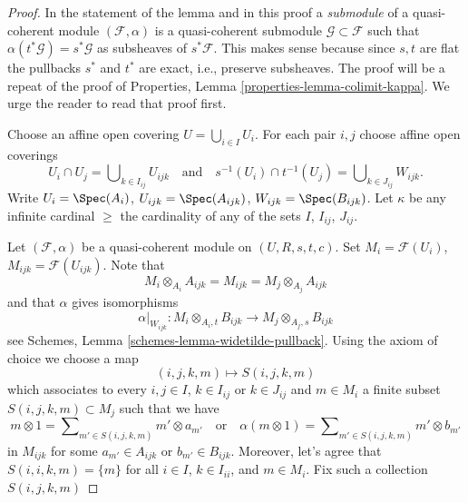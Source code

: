 \begin{proof}
In the statement of the lemma and in this proof
a {\it submodule} of a quasi-coherent module $(\mathcal{F}, \alpha)$
is a quasi-coherent submodule $\mathcal{G} \subset \mathcal{F}$
such that $\alpha(t^*\mathcal{G}) = s^*\mathcal{G}$ as subsheaves of
$s^*\mathcal{F}$. This makes sense because since $s, t$ are flat the
pullbacks $s^*$ and $t^*$ are exact, i.e., preserve subsheaves.
The proof will be a repeat of the proof of
Properties, Lemma \ref{properties-lemma-colimit-kappa}.
We urge the reader to read that proof first.

\medskip\noindent
Choose an affine open covering $U = \bigcup_{i \in I} U_i$.
For each pair $i, j$ choose affine open coverings
$$
U_i \cap U_j = \bigcup\nolimits_{k \in I_{ij}} U_{ijk}
\quad\text{and}\quad
s^{-1}(U_i) \cap t^{-1}(U_j) = \bigcup\nolimits_{k \in J_{ij}} W_{ijk}.
$$
Write $U_i = \Spec(A_i)$, $U_{ijk} = \Spec(A_{ijk})$,
$W_{ijk} = \Spec(B_{ijk})$.
Let $\kappa$ be any infinite cardinal $\geq$ the cardinality
of any of the sets $I$, $I_{ij}$, $J_{ij}$.

\medskip\noindent
Let $(\mathcal{F}, \alpha)$ be a quasi-coherent module on $(U, R, s, t, c)$.
Set $M_i = \mathcal{F}(U_i)$, $M_{ijk} = \mathcal{F}(U_{ijk})$.
Note that
$$
M_i \otimes_{A_i} A_{ijk} = M_{ijk} = M_j \otimes_{A_j} A_{ijk}
$$
and that $\alpha$ gives isomorphisms
$$
\alpha|_{W_{ijk}} :
M_i \otimes_{A_i, t} B_{ijk}
\longrightarrow
M_j \otimes_{A_j, s} B_{ijk}
$$
see
Schemes, Lemma \ref{schemes-lemma-widetilde-pullback}.
Using the axiom of choice we choose a map
$$
(i, j, k, m) \mapsto S(i, j, k, m)
$$
which associates to every $i, j \in I$, $k \in I_{ij}$ or $k \in J_{ij}$
and $m \in M_i$ a finite subset $S(i, j, k, m) \subset M_j$
such that we have
$$
m \otimes 1 = \sum\nolimits_{m' \in S(i, j, k, m)} m' \otimes a_{m'}
\quad\text{or}\quad
\alpha(m \otimes 1) = \sum\nolimits_{m' \in S(i, j, k, m)} m' \otimes b_{m'}
$$
in $M_{ijk}$ for some $a_{m'} \in A_{ijk}$ or $b_{m'} \in B_{ijk}$.
Moreover, let's agree that $S(i, i, k, m) = \{m\}$ for all
$i \in I$, $k \in I_{ii}$, and $m \in M_i$. Fix such a collection $S(i, j, k, m)$


\end{proof}
